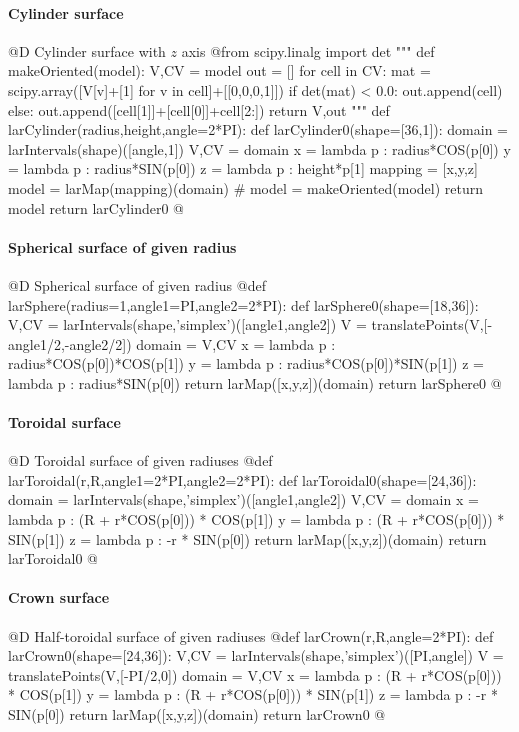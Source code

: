 \documentclass[11pt,oneside]{article}	%
\begin{document}
\paragraph{Cylinder surface}
@D Cylinder surface with $z$ axis
@{from scipy.linalg import det
"""
def makeOriented(model):
	V,CV = model
	out = []
	for cell in CV: 
		mat = scipy.array([V[v]+[1] for v in cell]+[[0,0,0,1]])
		if det(mat) < 0.0:
			out.append(cell)
		else:
			out.append([cell[1]]+[cell[0]]+cell[2:])
	return V,out
"""
def larCylinder(radius,height,angle=2*PI):
	def larCylinder0(shape=[36,1]):
		domain = larIntervals(shape)([angle,1])
		V,CV = domain
		x = lambda p : radius*COS(p[0])
		y = lambda p : radius*SIN(p[0])
		z = lambda p : height*p[1]
		mapping = [x,y,z]
		model = larMap(mapping)(domain)
		# model = makeOriented(model)
		return model
	return larCylinder0
@}
\paragraph{Spherical surface of given radius}
@D Spherical surface of given radius
@{def larSphere(radius=1,angle1=PI,angle2=2*PI):
	def larSphere0(shape=[18,36]):
		V,CV = larIntervals(shape,'simplex')([angle1,angle2])
		V = translatePoints(V,[-angle1/2,-angle2/2])
		domain = V,CV
		x = lambda p : radius*COS(p[0])*COS(p[1])
		y = lambda p : radius*COS(p[0])*SIN(p[1])
		z = lambda p : radius*SIN(p[0])
		return larMap([x,y,z])(domain)
	return larSphere0
@}
\paragraph{Toroidal surface}
@D Toroidal surface of given radiuses
@{def larToroidal(r,R,angle1=2*PI,angle2=2*PI):
	def larToroidal0(shape=[24,36]):
		domain = larIntervals(shape,'simplex')([angle1,angle2])
		V,CV = domain
		x = lambda p : (R + r*COS(p[0])) * COS(p[1])
		y = lambda p : (R + r*COS(p[0])) * SIN(p[1])
		z = lambda p : -r * SIN(p[0])
		return larMap([x,y,z])(domain)
	return larToroidal0
@}
\paragraph{Crown surface}
@D Half-toroidal surface of given radiuses
@{def larCrown(r,R,angle=2*PI):
	def larCrown0(shape=[24,36]):
		V,CV = larIntervals(shape,'simplex')([PI,angle])
		V = translatePoints(V,[-PI/2,0])
		domain = V,CV
		x = lambda p : (R + r*COS(p[0])) * COS(p[1])
		y = lambda p : (R + r*COS(p[0])) * SIN(p[1])
		z = lambda p : -r * SIN(p[0])
		return larMap([x,y,z])(domain)
	return larCrown0
@}
\end{document}

